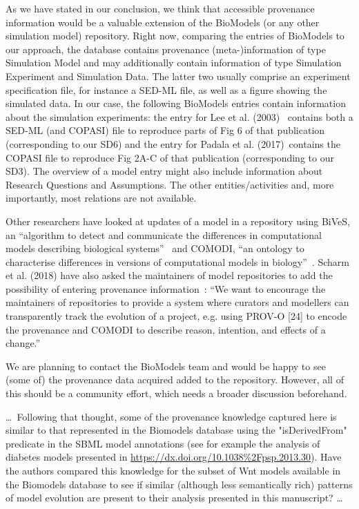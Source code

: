\documentclass{article}
\begin{document}
As we have stated in our conclusion, we think that accessible provenance information would be a valuable extension of the BioModels (or any other simulation model) repository.
Right now, comparing the entries of BioModels to our approach, the database contains provenance (meta-)information of type Simulation Model and may additionally contain information of type Simulation Experiment and Simulation Data.
The latter two usually comprise an experiment specification file, for instance a SED-ML file, as well as a figure showing the simulated data.
In our case, the following BioModels entries contain information about the simulation experiments: the entry for Lee et al. (2003)~\cite{Lee2003} contains both a SED-ML (and COPASI) file to reproduce parts of Fig 6 of that publication (corresponding to our SD6) and the entry for Padala et al. (2017)~\cite{Padala2017}contains the COPASI file to reproduce Fig 2A-C of that publication (corresponding to our SD3).
The overview of a model entry might also include information about Research Questions and Assumptions.
The other entities/activities and, more importantly, most relations are not available.

Other researchers have looked at updates of a model in a repository using BiVeS, an \enquote{algorithm to detect and communicate the differences in computational models describing biological systems}~\cite{Scharm2016a} and COMODI, \enquote{an ontology to characterise differences in versions of computational models in biology}~\cite{Scharm2016}.
Scharm et al. (2018) have also asked the maintainers of model repositories to add the possibility of entering provenance information~\cite{Scharm2018}: \enquote{We want to encourage the maintainers of repositories to provide a system where curators and modellers can transparently track the evolution of a project, e.g. using PROV-O [24] to encode the provenance and COMODI to describe reason, intention, and effects of a change.}

We are planning to contact the BioModels team and would be happy to see (some of) the provenance data acquired added to the repository.
However, all of this should be a community effort, which needs a broader discussion beforehand.

\begin{mdframed}
\ldots\, Following that thought, some of the provenance knowledge captured here is similar to that represented in the Biomodels database using the "isDerivedFrom" predicate in the SBML model annotations (see for example the analysis of diabetes models presented in \url{https://dx.doi.org/10.1038\%2Fpsp.2013.30}).
Have the authors compared this knowledge for the subset of Wnt models available in the Biomodels database to see if similar (although less semantically rich) patterns of model evolution are present to their analysis presented in this manuscript? \ldots
\end{mdframed}
\end{document}
